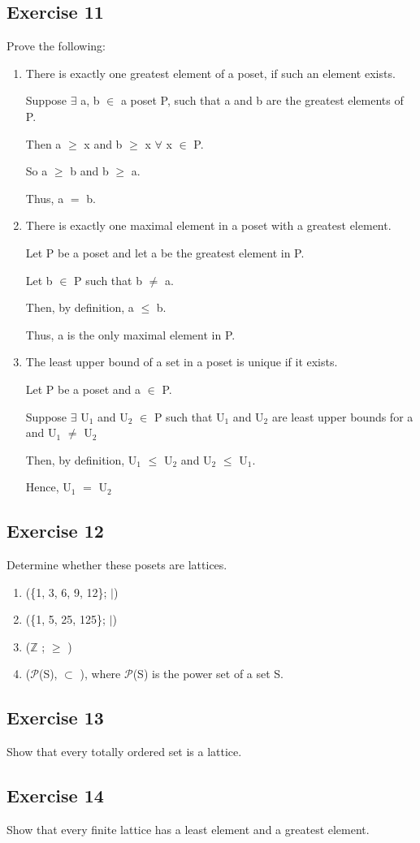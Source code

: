 \documentclass{article}
\newcommand{\mt}[1]{\ensuremath{#1}}
\newcommand\ssc[2][\DefaultOpt]{%
  \def\DefaultOpt{#2}%
  \subsection[#1]{#2}%
}
\newcommand{\balist}{\begin{enumerate}[label=\alph*.]}
\newcommand{\elist}{\end{enumerate}}
\newcommand{\bz}{\mt{\mathbb{Z}} }       %
\newcommand{\fa}{\mt{\forall} }          %
\newcommand{\mem}{\mt{\in} }
\newcommand{\exs}{\mt{\exists} }
\newcommand{\sbs}{\mt{\subset} }         %
\newcommand{\bk}[1]{\{#1\}}
\newcommand{\lse}{\mt{\leq} }
\newcommand{\gre}{\mt{\geq} }
\newcommand{\eql}{\mt{=} }
\newcommand{\uw}[2]{#1\mt{_{#2}}}
\begin{document}
\ssc{Exercise 11}{

Prove the following:

\balist
\item There is exactly one greatest element of a poset, if such an element exists.

Suppose \exs a, b \mem a poset P, such that a and b are the greatest elements of P.

Then a \gre x and b \gre x \fa x \mem P.

So a \gre b and b \gre a.

Thus, a \eql b.

\item There is exactly one maximal element in a poset with a greatest element.

Let P be a poset and let a be the greatest element in P.

Let b \mem P such that b $\neq$ a.

Then, by definition, a \lse b.

Thus, a is the only maximal element in P.

\item The least upper bound of a set in a poset is unique if it exists.

Let P be a poset and a \mem P.

Suppose \exs \uw{U}{1} and \uw{U}{2} \mem P such that \uw{U}{1} and \uw{U}{2} are least upper bounds for a and \uw{U}{1} $\neq$ \uw{U}{2}

Then, by definition, \uw{U}{1} \lse \uw{U}{2} and \uw{U}{2} \lse \uw{U}{1}.

Hence, \uw{U}{1} \eql \uw{U}{2}
\elist

}

\ssc{Exercise 12}{

Determine whether these posets are lattices.

\balist
\item (\bk{1, 3, 6, 9, 12}; $\vert$)
\item (\bk{1, 5, 25, 125}; $\vert$)
\item (\bz; \gre)
\item ($\mathcal{P}$(S), \sbs), where $\mathcal{P}$(S) is the power set of a set S.
\elist

}

\ssc{Exercise 13}{

Show that every totally ordered set is a lattice.

}

\ssc{Exercise 14}{

Show that every finite lattice has a least element and a greatest element.

}
\end{document}
